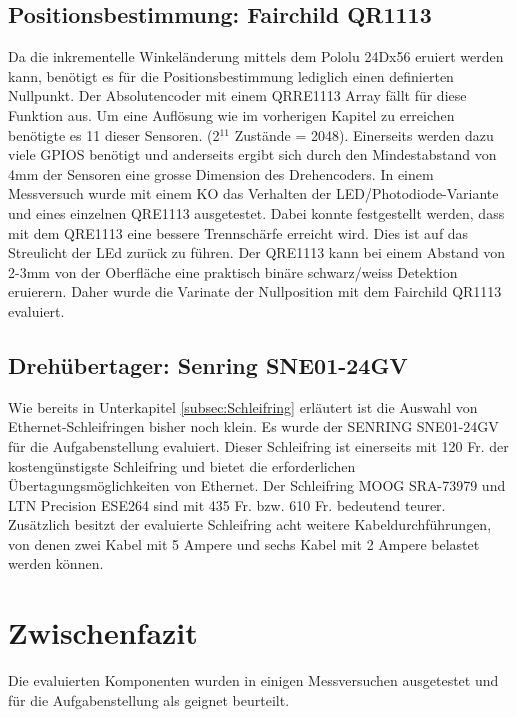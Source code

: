 \subsection{Positionsbestimmung: Fairchild QR1113}
\label{subsec:QR1113}
Da die inkrementelle Winkeländerung mittels dem Pololu 24Dx56 eruiert werden kann, benötigt es für die Positionsbestimmung lediglich einen definierten Nullpunkt. Der Absolutencoder mit einem QRRE1113 Array fällt für diese Funktion aus. Um eine Auflösung wie im vorherigen Kapitel zu erreichen benötigte es 11 dieser Sensoren. (2$^11$ Zustände = 2048). Einerseits werden dazu viele GPIOS benötigt und anderseits ergibt sich durch den Mindestabstand von 4mm der Sensoren eine grosse Dimension des Drehencoders. 
In einem Messversuch wurde mit einem \ac{KO} das Verhalten der LED/Photodiode-Variante und eines einzelnen QRE1113 ausgetestet. Dabei konnte festgestellt werden, dass mit dem QRE1113 eine bessere Trennschärfe erreicht wird. Dies ist auf das Streulicht der LEd zurück zu führen. Der QRE1113 kann bei einem Abstand von 2-3mm von der Oberfläche eine praktisch binäre schwarz/weiss Detektion eruierern. Daher wurde die Varinate der Nullposition mit dem Fairchild QR1113 evaluiert.

\subsection{Drehübertager: Senring SNE01-24GV}
\label{subsec:SNE01}
Wie bereits in Unterkapitel \ref{subsec:Schleifring} erläutert ist die Auswahl von Ethernet-Schleifringen bisher noch klein. Es wurde der SENRING SNE01-24GV für die Aufgabenstellung evaluiert. Dieser Schleifring ist einerseits mit 120 Fr. der kostengünstigste Schleifring und bietet die erforderlichen Übertagungsmöglichkeiten von Ethernet. Der Schleifring MOOG SRA-73979 und LTN Precision ESE264 sind mit 435 Fr. bzw. 610 Fr. bedeutend teurer. Zusätzlich besitzt der evaluierte Schleifring acht weitere Kabeldurchführungen, von denen zwei Kabel mit 5 Ampere und sechs Kabel mit 2 Ampere belastet werden können.\cite{senring}

\section{Zwischenfazit}
\label{ZwischenfazitKonz}
Die evaluierten Komponenten wurden in einigen Messversuchen ausgetestet und für die Aufgabenstellung als geignet beurteilt.  




